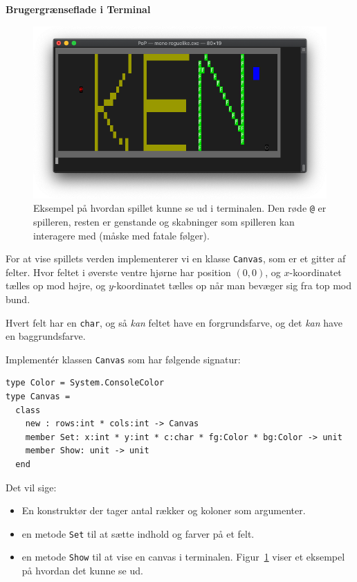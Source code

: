 \textbf{Brugergrænseflade i Terminal}
\begin{figure}[thp]\centering

  \includegraphics[width=.99\linewidth]{screenshot.png}

  \caption{Eksempel på hvordan spillet kunne se ud i terminalen. Den
    røde \texttt{@} er spilleren, resten er genstande og skabninger
    som spilleren kan interagere med (måske med fatale følger).}
  \label{fig:roguelike-screenshot}
\end{figure}

For at vise spillets verden implementerer vi en klasse
\lstinline{Canvas}, som er et gitter af felter. Hvor feltet
i øverste ventre hjørne har position $(0,0)$, og $x$-koordinatet
tælles op mod højre, og $y$-koordinatet tælles op når man bevæger sig
fra top mod bund.

Hvert felt har en \lstinline{char}, og så \emph{kan}
feltet have en forgrundsfarve, og det \emph{kan} have en baggrundsfarve.

Implementér klassen \lstinline{Canvas} som har følgende signatur:

\begin{lstlisting}
type Color = System.ConsoleColor
type Canvas =
  class
    new : rows:int * cols:int -> Canvas
    member Set: x:int * y:int * c:char * fg:Color * bg:Color -> unit
    member Show: unit -> unit
  end
\end{lstlisting}

Det vil sige:
\begin{itemize}
\item En konstruktør der tager antal rækker og koloner som argumenter.
\item en metode \lstinline{Set} til at sætte indhold og farver på et
  felt.
\item en metode \lstinline{Show} til at vise en canvas i
  terminalen. Figur~\ref{fig:roguelike-screenshot} viser et eksempel
  på hvordan det kunne se ud.
\end{itemize}

